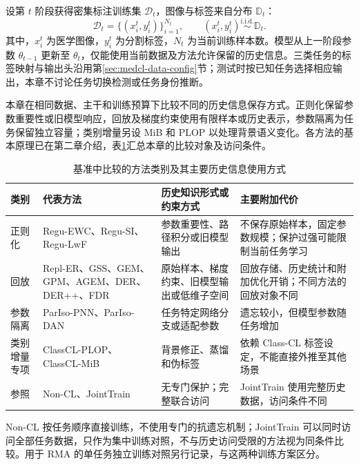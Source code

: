 设第 $t$ 阶段获得密集标注训练集 $\mathcal D_t$，图像与标签来自分布 $\mathbb D_t$：
\begin{equation}
\mathcal{D}_t=\{(x_i^t,y_i^t)\}_{i=1}^{N_t},
\qquad
(x_i^t,y_i^t)\overset{\mathrm{i.i.d.}}{\sim}\mathbb{D}_t.
\label{eq:benchmark-task-distribution}
\end{equation}
其中，$x_i^t$ 为医学图像，$y_i^t$ 为分割标签，$N_t$ 为当前训练样本数。模型从上一阶段参数 $\theta_{t-1}$ 更新至 $\theta_t$，仅能使用当前数据及方法允许保留的历史信息。三类任务的标签映射与输出头沿用第\ref{sec:medcl-data-config}节；测试时按已知任务选择相应输出，本章不讨论任务切换检测或任务身份推断。

本章在相同数据、主干和训练预算下比较不同的历史信息保存方式。正则化保留参数重要性或旧模型响应，回放及梯度约束使用有限样本或历史表示，参数隔离为任务保留独立容量；类别增量另设 MiB 和 PLOP 以处理背景语义变化\cite{cermelli2020mib,douillard2021plop}。各方法的基本原理已在第二章介绍，表\ref{tab:benchmark-methods}汇总本章的比较对象及访问条件。

\begin{table}[htbp]
\centering
\caption{基准中比较的方法类别及其主要历史信息使用方式}
\label{tab:benchmark-methods}
\thesistablefont
\setlength{\tabcolsep}{3pt}
\renewcommand{\arraystretch}{1.15}
\begin{tabular}{p{2.0cm}p{4.0cm}p{4.0cm}p{3.6cm}}
\toprule
类别 & 代表方法 & 历史知识形式或约束方式 & 主要附加代价 \\
\midrule
正则化 &
Regu-EWC、Regu-SI、Regu-LwF &
参数重要性、路径积分或旧模型输出 &
不保存原始样本，固定参数规模；保护过强可能限制当前任务学习 \\
\addlinespace
回放 &
Repl-ER、GSS、GEM、GPM、AGEM、DER、DER++、FDR &
原始样本、梯度约束、旧模型输出或低维子空间 &
回放存储、历史统计和附加优化开销；不同方法的回放对象不同 \\
\addlinespace
参数隔离 &
ParIso-PNN、ParIso-DAN &
任务特定网络分支或适配参数 &
遗忘较小，但模型参数随任务增加 \\
\addlinespace
类别增量专项 &
ClassCL-PLOP、ClassCL-MiB &
背景修正、蒸馏和伪标签 &
依赖 Class-CL 标签设定，不能直接外推至其他场景 \\
\addlinespace
参照 &
Non-CL、JointTrain &
无专门保护；完整联合访问 &
JointTrain 使用完整历史数据，访问条件不同 \\
\bottomrule
\end{tabular}

\end{table}

Non-CL 按任务顺序直接训练，不使用专门的抗遗忘机制；JointTrain 可以同时访问全部任务数据，只作为集中训练对照，不与历史访问受限的方法视为同条件比较。用于 RMA 的单任务独立训练对照另行记录，与这两种训练方案区分。

